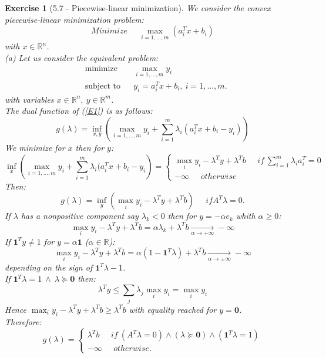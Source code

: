 \documentclass[11pt]{article}
\theoremstyle{exo}
\newtheorem*{exercise}{Exercise}
\newcommand{\R}{\mathbb{R}}
\newcommand{\1}{\mathbf{1}}
\newcommand{\0}{\mathbf{0}}
\begin{document}
\begin{exercise}[5.7 - Piecewise-linear minimization]
We consider the convex piecewise-linear minimization problem:
\begin{equation}
\label{E2}
Minimize\phantom{abc}\max_{i=1,...,m}(a_i^Tx+b_i)
\end{equation}
with $x\in\R^n$.\\
(a) Let us consider the equivalent problem:
\begin{equation}
\label{E1}
\begin{aligned}
& {\text{minimize}} & & \max_{i=1,...,m}y_i \\
& \text{subject to} & & y_i=a_i^Tx+b_i,\: i=1,...,m.
\end{aligned}
\end{equation}
with variables $x\in\R^n,\:y\in\R^m$.\\
The dual function of (\ref{E1}) is as follows:
\[
g(\lambda)=\inf_{x,y}\left(\max_{i=1,...,m}y_i+\sum\limits_{i=1}^m\lambda_i(a_i^Tx+b_i-y_i)\right)
\]
We minimize for $x$ then for $y$:
\[\inf_x\left(\max_{i=1,...,m}y_i+\sum\limits_{i=1}^m\lambda_i(a_i^Tx+b_i-y_i\right)=\begin{cases}
\max_iy_i-\lambda^Ty+\lambda^Tb\phantom{abc}if\:\sum\limits_{i=1}^m\lambda_ia_i^T=0\\
-\infty\phantom{abc}otherwise
\end{cases}\] 
Then:
\[
g(\lambda)=\inf_y(\max_iy_i-\lambda^Ty+\lambda^Tb)\phantom{abc}ifA^T\lambda=0.
\]
If $\lambda$ has a nonpositive component say $\lambda_k<0$ then for $y=-\alpha e_k$ whith $\alpha\geq 0$:\[\max_iy_i-\lambda^Ty+\lambda^Tb=\alpha\lambda_k+\lambda^Tb\xrightarrow[\alpha\to+\infty]{}-\infty\]
If $\1^Ty\neq 1$ for $y=\alpha\1$ ($\alpha\in\R$):
\[\max_iy_i-\lambda^Ty+\lambda^Tb=\alpha(1-\1^T\lambda)+\lambda^Tb\xrightarrow[\alpha\to\pm\infty]{}-\infty\]
depending on the sign of $\1^T\lambda-1$.\\
If $\1^T\lambda=1\:\wedge\:\lambda\succeq\0$ then:
\[\lambda^Ty\leq\sum_j\lambda_j\max_iy_i=\max_iy_i\]
Hence $\max_iy_i-\lambda^Ty+\lambda^Tb\geq\lambda^Tb$ with equality reached for $y=\0$.\\
Therefore:
\begin{equation*}
g(\lambda)=\begin{cases}
\lambda^Tb\phantom{abc}if\:(A^T\lambda=0)\wedge(\lambda\succeq\0)\wedge(\1^T\lambda=1)\\
-\infty\phantom{abc}otherwise.
\end{cases}
\end{equation*}

\end{exercise}
\end{document}
